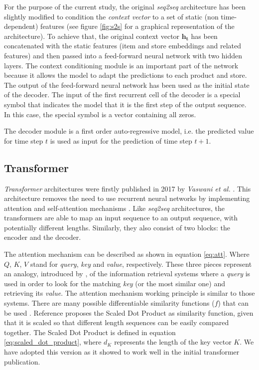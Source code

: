 \documentclass{elsarticle}
\begin{document}
   For the purpose of the current study, the original \textit{seq2seq} architecture has been slightly modified to condition the \textit{context vector} to a set of static (non time-dependent) features (see figure \ref{fig:s2s} for a graphical representation of the architecture). To achieve that, the original context vector $\mathbf{h_t}$ has been concatenated with the static features (item and store embeddings and related features) and then passed into a feed-forward neural network with two hidden layers. The context conditioning module is an important part of the network because it allows the model to adapt the predictions to each product and store. The output of the feed-forward neural network has been used as the initial state of the decoder. The input of the first recurrent cell of the decoder is a special symbol that indicates the model that it is the first step of the output sequence. In this case, the special symbol is a vector containing all zeros. 
   
   The decoder module is a first order auto-regressive model, i.e. the predicted value for time step $t$ is used as input for the prediction of time step $t+1$.
   
   
	
	\subsection{Transformer}
	\textit{Transformer} architectures were firstly published  in 2017 by \textit{Vaswani et al.} \cite{vaswani2017}. This architecture removes the need to use recurrent neural networks by implementing attention and self-attention mechanisms \cite{bahdanau2015}.  Like \textit{seq2seq} architectures, the transformers are able to map an input sequence to an output sequence, with potentially different lengths. Similarly, they also consist of two blocks: the encoder and the decoder.
	
	The attention mechanism can be described as shown in equation \ref{eq:att}. Where $Q$, $K$, $V$ stand for \textit{query}, \textit{key} and \textit{value}, respectively. These three pieces represent an analogy, introduced by \cite{vaswani2017}, of the information retrieval systems where a \textit{query} is used in order to look for the matching \textit{key} (or the most similar one) and retrieving its \textit{value}. The attention mechanism working principle is similar to those systems. There are many possible differentiable similarity functions ($f$) that can be used \cite{kamath2019}. Reference \cite{vaswani2017} proposes the Scaled Dot Product as similarity function, given that it is scaled so that different length sequences can be easily compared together. The Scaled Dot Product is defined in equation \ref{eq:scaled_dot_product},  where $d_K$ represents the length of the key vector $K$. We have adopted this version as it showed to work well in the initial transformer publication.
	
\end{document}
